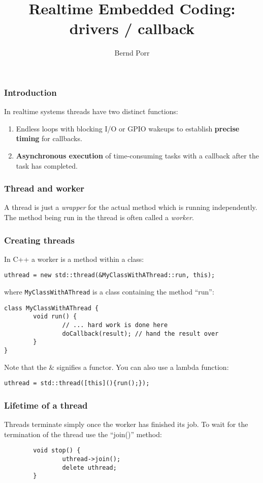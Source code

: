 \documentclass[xcolor=dvipsnames]{beamer}
\title{Realtime Embedded Coding: drivers / callback}
\date{}
\author{Bernd Porr}
\begin{document}
\begin{frame}
\titlepage
\end{frame}

\begin{frame}[fragile]
\frametitle{Introduction}
In realtime systems threads have two distinct functions:
\begin{enumerate}
\item Endless loops with blocking I/O or GPIO wakeups
  to establish \textbf{precise timing} for callbacks.
\item \textbf{Asynchronous execution} of time-consuming tasks
  with a callback after the task has completed.
\end{enumerate}
\end{frame}


\begin{frame}[fragile]
\frametitle{Thread and worker}
A thread is just a \textsl{wrapper} for the actual method
which is running independently. The method being run in the thread
is often called a \textsl{worker}.
\end{frame}


\begin{frame}[fragile]
\frametitle{Creating threads}
In C++ a worker is a method within
a class:
\begin{verbatim}
uthread = new std::thread(&MyClassWithAThread::run, this);
\end{verbatim}
where \texttt{MyClassWithAThread} is a class containing the method ``run'':
\begin{verbatim}
class MyClassWithAThread {
        void run() {
                // ... hard work is done here
                doCallback(result); // hand the result over
        }
}
\end{verbatim}
Note that the \& signifies a functor. You can also use a lambda function:
\begin{verbatim}
uthread = std::thread([this](){run();});
\end{verbatim}

\end{frame}


\begin{frame}[fragile]
\frametitle{Lifetime of a thread}
Threads terminate simply once the worker has finished its job.
To wait for the termination
of the thread use the ``join()'' method:
\begin{verbatim}
        void stop() {
                uthread->join();
                delete uthread;
        }
\end{verbatim}
\end{frame}
\end{document}
